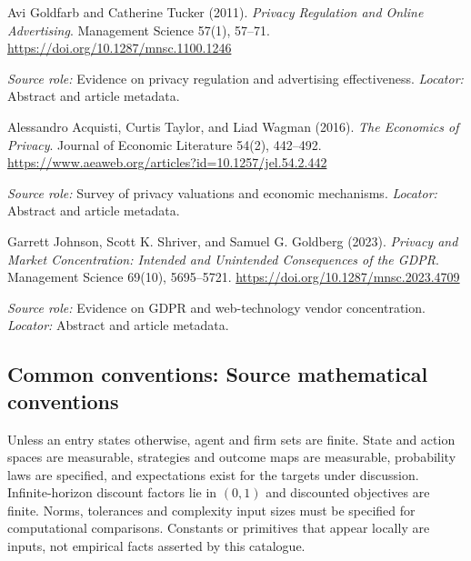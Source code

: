 \documentclass[11pt,a4paper]{article}
\begin{document}
\begin{enumerate}[label={[S\arabic*]},leftmargin=*]

\item Avi Goldfarb and Catherine Tucker (2011). \emph{Privacy Regulation and Online Advertising}. Management Science 57(1), 57--71. \url{https://doi.org/10.1287/mnsc.1100.1246}\par \textit{Source role:} Evidence on privacy regulation and advertising effectiveness. \textit{Locator:} Abstract and article metadata.

\item Alessandro Acquisti, Curtis Taylor, and Liad Wagman (2016). \emph{The Economics of Privacy}. Journal of Economic Literature 54(2), 442--492. \url{https://www.aeaweb.org/articles?id=10.1257/jel.54.2.442}\par \textit{Source role:} Survey of privacy valuations and economic mechanisms. \textit{Locator:} Abstract and article metadata.

\item Garrett Johnson, Scott K. Shriver, and Samuel G. Goldberg (2023). \emph{Privacy and Market Concentration: Intended and Unintended Consequences of the GDPR}. Management Science 69(10), 5695--5721. \url{https://doi.org/10.1287/mnsc.2023.4709}\par \textit{Source role:} Evidence on GDPR and web-technology vendor concentration. \textit{Locator:} Abstract and article metadata.

\end{enumerate}

\subsection*{Common conventions: Source mathematical conventions}

Unless an entry states otherwise, agent and firm sets are finite. State and action spaces are measurable, strategies and outcome maps are measurable, probability laws are specified, and expectations exist for the targets under discussion. Infinite-horizon discount factors lie in $(0,1)$ and discounted objectives are finite. Norms, tolerances and complexity input sizes must be specified for computational comparisons. Constants or primitives that appear locally are inputs, not empirical facts asserted by this catalogue.
\end{document}
